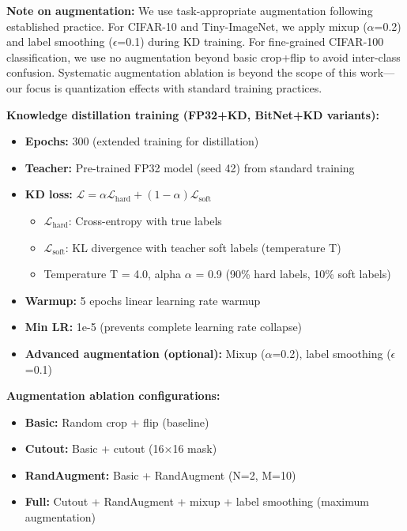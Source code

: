\textbf{Note on augmentation:} We use task-appropriate augmentation following established practice. For CIFAR-10 and Tiny-ImageNet, we apply mixup ($\alpha$=0.2) and label smoothing ($\epsilon$=0.1) during KD training. For fine-grained CIFAR-100 classification, we use no augmentation beyond basic crop+flip to avoid inter-class confusion. Systematic augmentation ablation is beyond the scope of this work—our focus is quantization effects with standard training practices.

\textbf{Knowledge distillation training (FP32+KD, BitNet+KD variants):}
\begin{itemize}
    \item \textbf{Epochs:} 300 (extended training for distillation)
    \item \textbf{Teacher:} Pre-trained FP32 model (seed 42) from standard training
    \item \textbf{KD loss:} $\mathcal{L} = \alpha \mathcal{L}_{\text{hard}} + (1-\alpha) \mathcal{L}_{\text{soft}}$
    \begin{itemize}
        \item $\mathcal{L}_{\text{hard}}$: Cross-entropy with true labels
        \item $\mathcal{L}_{\text{soft}}$: KL divergence with teacher soft labels (temperature T)
        \item Temperature T = 4.0, alpha $\alpha$ = 0.9 (90\% hard labels, 10\% soft labels)
    \end{itemize}
    \item \textbf{Warmup:} 5 epochs linear learning rate warmup
    \item \textbf{Min LR:} 1e-5 (prevents complete learning rate collapse)
    \item \textbf{Advanced augmentation (optional):} Mixup ($\alpha$=0.2), label smoothing ($\epsilon$=0.1)
\end{itemize}

\textbf{Augmentation ablation configurations:}
\begin{itemize}
    \item \textbf{Basic:} Random crop + flip (baseline)
    \item \textbf{Cutout:} Basic + cutout (16×16 mask)~\cite{devries2017cutout}
    \item \textbf{RandAugment:} Basic + RandAugment (N=2, M=10)~\cite{cubuk2020randaugment}
    \item \textbf{Full:} Cutout + RandAugment + mixup + label smoothing (maximum augmentation)
\end{itemize}

